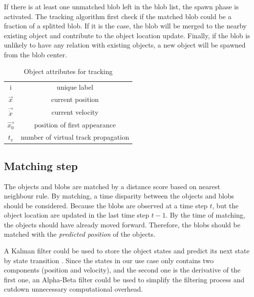 If there is at least one unmatched blob left in the blob list, the spawn phase is activated. The tracking algorithm first check if the matched blob could be a fraction of a splitted blob. If it is the case, the blob will be merged to the nearby existing object and contribute to the object location update. Finally, if the blob is unlikely to have any relation with existing objects, a new object will be spawned from the blob center.
\begin{table}
  \centering
  \begin{tabular}{|c|c|}
    \hline
    i & unique label \\
    $\vec{x}$ & current position \\
    $\vec{\dot{x}}$ & current velocity \\
    $\vec{x_0}$ & position of first appearance \\
    $t_v$ & number of virtual track propagation \\
    \hline
  \end{tabular}
  \caption{Object attributes for tracking}\label{tab:objectattributes}
\end{table}

\subsection{Matching step}
The objects and blobs are matched by a distance score based on nearest neighbour rule. By matching, a time disparity between the objects and blobs should be considered. Because the blobs are observed at a time step $t$, but the object location are updated in the last time step $t-1$. By the time of matching, the objects should have already moved forward. Therefore, the blobs should be matched with the \emph{predicted position} of the objects.

A Kalman filter could be used to store the object states and predict its next state by state transition \cite{mika,virtualtrack}. Since the states in our use case only contains two components (position and velocity), and the second one is the derivative of the first one, an Alpha-Beta filter could be used to simplify the filtering process and cutdown unnecessary computational overhead.

